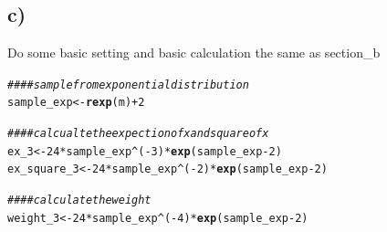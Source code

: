 \documentclass{article}\usepackage[]{graphicx}\usepackage[]{color}
\makeatletter
\newcommand{\hlnum}[1]{\textcolor[rgb]{0.686,0.059,0.569}{#1}}%
\newcommand{\hlcom}[1]{\textcolor[rgb]{0.678,0.584,0.686}{\textit{#1}}}%
\newcommand{\hlopt}[1]{\textcolor[rgb]{0,0,0}{#1}}%
\newcommand{\hlstd}[1]{\textcolor[rgb]{0.345,0.345,0.345}{#1}}%
\newcommand{\hlkwb}[1]{\textcolor[rgb]{0.69,0.353,0.396}{#1}}%
\newcommand{\hlkwd}[1]{\textcolor[rgb]{0.737,0.353,0.396}{\textbf{#1}}}%
\newenvironment{kframe}{%
 \def\at@end@of@kframe{}%
 \ifinner\ifhmode%
  \def\at@end@of@kframe{\end{minipage}}%
  \begin{minipage}{\columnwidth}%
 \fi\fi%
 \def\FrameCommand##1{\hskip\@totalleftmargin \hskip-\fboxsep
 \colorbox{shadecolor}{##1}\hskip-\fboxsep
     \hskip-\linewidth \hskip-\@totalleftmargin \hskip\columnwidth}%
 \MakeFramed {\advance\hsize-\width
   \@totalleftmargin\z@ \linewidth\hsize
   \@setminipage}}%
 {\par\unskip\endMakeFramed%
 \at@end@of@kframe}
\newenvironment{knitrout}{}{} %
\makeatother
\begin{document}
\subsection{c)}
Do some basic setting and basic calculation the same as section\_b
\begin{knitrout}
\color{fgcolor}\begin{kframe}
\begin{alltt}
\hlcom{####sample from exponential distribution}
\hlstd{sample_exp}\hlkwb{<-}\hlkwd{rexp}\hlstd{(m)}\hlopt{+}\hlnum{2}

\hlcom{####calcualte the expection of x and square of x}
\hlstd{ex_3}\hlkwb{<-}\hlnum{24}\hlopt{*}\hlstd{sample_exp}\hlopt{^}\hlstd{(}\hlopt{-}\hlnum{3}\hlstd{)}\hlopt{*}\hlkwd{exp}\hlstd{(sample_exp}\hlopt{-}\hlnum{2}\hlstd{)}
\hlstd{ex_square_3}\hlkwb{<-}\hlnum{24}\hlopt{*}\hlstd{sample_exp}\hlopt{^}\hlstd{(}\hlopt{-}\hlnum{2}\hlstd{)}\hlopt{*}\hlkwd{exp}\hlstd{(sample_exp}\hlopt{-}\hlnum{2}\hlstd{)}

\hlcom{####calculate the weight}
\hlstd{weight_3}\hlkwb{<-}\hlnum{24}\hlopt{*}\hlstd{sample_exp}\hlopt{^}\hlstd{(}\hlopt{-}\hlnum{4}\hlstd{)}\hlopt{*}\hlkwd{exp}\hlstd{(sample_exp}\hlopt{-}\hlnum{2}\hlstd{)}
\end{alltt}
\end{kframe}
\end{knitrout}
\end{document}
